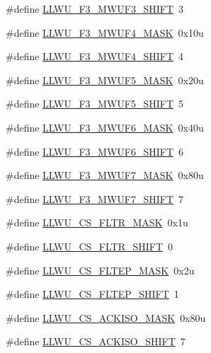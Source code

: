 \begin{DoxyCompactItemize}
\#define \hyperlink{group___l_l_w_u___register___masks_ga91a71ba06b95076252cd2594112da05d}{L\+L\+W\+U\+\_\+\+F3\+\_\+\+M\+W\+U\+F3\+\_\+\+S\+H\+I\+FT}~3
\item 
\#define \hyperlink{group___l_l_w_u___register___masks_gabd85c849a3b177444a91aa37457252a8}{L\+L\+W\+U\+\_\+\+F3\+\_\+\+M\+W\+U\+F4\+\_\+\+M\+A\+SK}~0x10u
\item 
\#define \hyperlink{group___l_l_w_u___register___masks_gac1d2eb89a620cf503f11eecf9e8ece1f}{L\+L\+W\+U\+\_\+\+F3\+\_\+\+M\+W\+U\+F4\+\_\+\+S\+H\+I\+FT}~4
\item 
\#define \hyperlink{group___l_l_w_u___register___masks_gaeb14754fa2d5b4c1fd50b9df98f11b01}{L\+L\+W\+U\+\_\+\+F3\+\_\+\+M\+W\+U\+F5\+\_\+\+M\+A\+SK}~0x20u
\item 
\#define \hyperlink{group___l_l_w_u___register___masks_gac8a9d2de72a5034fae66714d25aa5f33}{L\+L\+W\+U\+\_\+\+F3\+\_\+\+M\+W\+U\+F5\+\_\+\+S\+H\+I\+FT}~5
\item 
\#define \hyperlink{group___l_l_w_u___register___masks_gabd1f915448c7918a8aabc74239d7e773}{L\+L\+W\+U\+\_\+\+F3\+\_\+\+M\+W\+U\+F6\+\_\+\+M\+A\+SK}~0x40u
\item 
\#define \hyperlink{group___l_l_w_u___register___masks_gaab649d98d5d8eb9f2f272649ace225c4}{L\+L\+W\+U\+\_\+\+F3\+\_\+\+M\+W\+U\+F6\+\_\+\+S\+H\+I\+FT}~6
\item 
\#define \hyperlink{group___l_l_w_u___register___masks_ga2ddb11dc5e9f8a8404ccf99f10046b5a}{L\+L\+W\+U\+\_\+\+F3\+\_\+\+M\+W\+U\+F7\+\_\+\+M\+A\+SK}~0x80u
\item 
\#define \hyperlink{group___l_l_w_u___register___masks_gaee31def5b074844cbf46f9d7e54d2d4f}{L\+L\+W\+U\+\_\+\+F3\+\_\+\+M\+W\+U\+F7\+\_\+\+S\+H\+I\+FT}~7
\item 
\#define \hyperlink{group___l_l_w_u___register___masks_ga6f4b9c886f8c6ae0ebfe6e9f5e42c5d9}{L\+L\+W\+U\+\_\+\+C\+S\+\_\+\+F\+L\+T\+R\+\_\+\+M\+A\+SK}~0x1u
\item 
\#define \hyperlink{group___l_l_w_u___register___masks_gacf36e6ab335e1c2eba198576b5e83c85}{L\+L\+W\+U\+\_\+\+C\+S\+\_\+\+F\+L\+T\+R\+\_\+\+S\+H\+I\+FT}~0
\item 
\#define \hyperlink{group___l_l_w_u___register___masks_ga06c0fb6961f5851f5c3ad7a1be7eab05}{L\+L\+W\+U\+\_\+\+C\+S\+\_\+\+F\+L\+T\+E\+P\+\_\+\+M\+A\+SK}~0x2u
\item 
\#define \hyperlink{group___l_l_w_u___register___masks_ga5a01d2c1ffbcc63a4e59de492de806f0}{L\+L\+W\+U\+\_\+\+C\+S\+\_\+\+F\+L\+T\+E\+P\+\_\+\+S\+H\+I\+FT}~1
\item 
\#define \hyperlink{group___l_l_w_u___register___masks_gaaf436b9fe7526ef4acebf41787c7e05d}{L\+L\+W\+U\+\_\+\+C\+S\+\_\+\+A\+C\+K\+I\+S\+O\+\_\+\+M\+A\+SK}~0x80u
\item 
\#define \hyperlink{group___l_l_w_u___register___masks_ga1b0666eec878d329580b2d83cbaee827}{L\+L\+W\+U\+\_\+\+C\+S\+\_\+\+A\+C\+K\+I\+S\+O\+\_\+\+S\+H\+I\+FT}~7
\end{DoxyCompactItemize}


